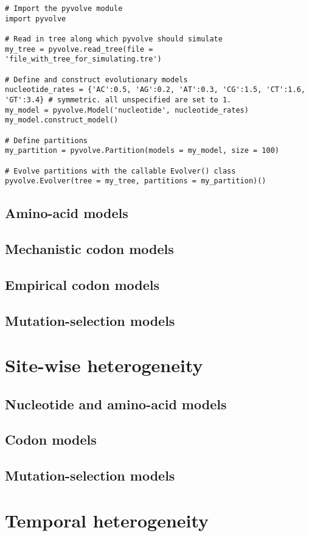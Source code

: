 \documentclass{article}
\begin{document}
\begin{lstlisting}
# Import the pyvolve module
import pyvolve

# Read in tree along which pyvolve should simulate
my_tree = pyvolve.read_tree(file = 'file_with_tree_for_simulating.tre')

# Define and construct evolutionary models
nucleotide_rates = {'AC':0.5, 'AG':0.2, 'AT':0.3, 'CG':1.5, 'CT':1.6, 'GT':3.4} # symmetric. all unspecified are set to 1.
my_model = pyvolve.Model('nucleotide', nucleotide_rates)
my_model.construct_model()

# Define partitions
my_partition = pyvolve.Partition(models = my_model, size = 100)

# Evolve partitions with the callable Evolver() class
pyvolve.Evolver(tree = my_tree, partitions = my_partition)()
\end{lstlisting}


\subsection{Amino-acid models}
\subsection{Mechanistic codon models}
\subsection{Empirical codon models}
\subsection{Mutation-selection models}
\section{Site-wise heterogeneity}
\subsection{Nucleotide and amino-acid models}
\subsection{Codon models}
\subsection{Mutation-selection models}
\section{Temporal heterogeneity}
\end{document}
